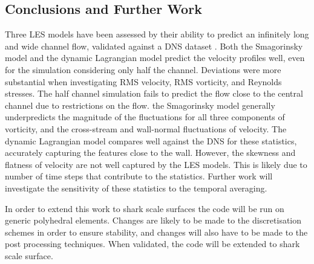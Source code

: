 \documentclass[12pt,oneside,a4paper]{article}
\begin{document}
\subsection{Conclusions and Further Work}
Three LES models have been assessed by their ability to predict an infinitely long and wide channel flow, validated against a DNS dataset \citep{vreman2014}. Both the Smagorinsky model \citep{smagorinsky1963} and the dynamic Lagrangian model \citep{meneveau1996} predict the velocity profiles well, even for the simulation considering only half the channel. Deviations were more substantial when investigating RMS velocity, RMS vorticity, and Reynolds stresses. The half channel simulation fails to predict the flow close to the central channel due to restrictions on the flow. the Smagorinsky model generally underpredicts the magnitude of the fluctuations for all three components of vorticity, and the cross-stream and wall-normal fluctuations of velocity. The dynamic Lagrangian model compares well against the DNS for these statistics, accurately capturing the features close to the wall. However, the skewness and flatness of velocity are not well captured by the LES models. This is likely due to number of time steps that contribute to the statistics. Further work will investigate the sensitivity of these statistics to the temporal averaging.

In order to extend this work to shark scale surfaces the code will be run on generic polyhedral elements. Changes are likely to be made to the discretisation schemes in order to ensure stability, and changes will also have to be made to the post processing techniques. When validated, the code will be extended to shark scale surface. 

\newpage
\end{document}
